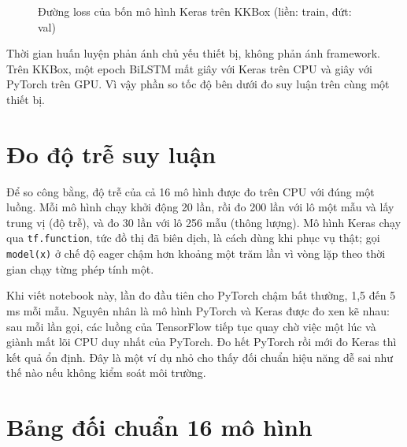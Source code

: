 \begin{figure}[H]
  \centering
  \caption{Đường loss của bốn mô hình Keras trên KKBox (liền: train, đứt: val)}
  \label{fig:loss-keras-kkbox}
\end{figure}

Thời gian huấn luyện phản ánh chủ yếu thiết bị, không phản ánh framework. Trên KKBox, một epoch BiLSTM mất
 giây với Keras trên CPU và  giây
với PyTorch trên GPU. Vì vậy phần so tốc độ bên dưới đo suy luận trên cùng một thiết bị.

\section{Đo độ trễ suy luận}

Để so công bằng, độ trễ của cả 16 mô hình được đo trên CPU với đúng một luồng. Mỗi mô hình chạy khởi động 20 lần, rồi đo
200 lần với lô một mẫu và lấy trung vị (độ trễ), và đo 30 lần với lô 256 mẫu (thông lượng). Mô hình Keras chạy qua
\texttt{tf.function}, tức đồ thị đã biên dịch, là cách dùng khi phục vụ thật; gọi \texttt{model(x)} ở chế độ eager chậm
hơn khoảng một trăm lần vì vòng lặp theo thời gian chạy từng phép tính một.


Khi viết notebook này, lần đo đầu tiên cho PyTorch chậm bất thường, 1,5 đến 5 ms mỗi mẫu. Nguyên nhân là mô hình PyTorch và
Keras được đo xen kẽ nhau: sau mỗi lần gọi, các luồng của TensorFlow tiếp tục quay chờ việc một lúc và giành mất lõi CPU
duy nhất của PyTorch. Đo hết PyTorch rồi mới đo Keras thì kết quả ổn định. Đây là một ví dụ nhỏ cho thấy đối chuẩn hiệu
năng dễ sai như thế nào nếu không kiểm soát môi trường.

\section{Bảng đối chuẩn 16 mô hình}

\begin{table}[H]
  \centering\scriptsize
  \setlength{\tabcolsep}{4pt}
  \caption{Đối chuẩn trên AMZN: 8 mô hình và mốc ngây thơ}
  \label{tab:bench-amzn}
  
\end{table}

\begin{table}[H]
  \centering\scriptsize
  \setlength{\tabcolsep}{4pt}
  \caption{Đối chuẩn trên KKBox: 8 mô hình}
  \label{tab:bench-kkbox}
  
\end{table}

